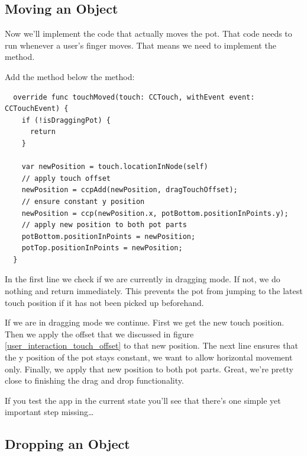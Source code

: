 \subsection{Moving an Object}
Now we'll implement the code that actually moves the pot. That code needs to run
whenever a user's finger moves. That means we need to implement the
 method.
\begin{leftbar}
Add the  method below the  method:
\begin{lstlisting}
  override func touchMoved(touch: CCTouch, withEvent event: CCTouchEvent) {
    if (!isDraggingPot) {
      return
    }
    
    var newPosition = touch.locationInNode(self)
    // apply touch offset
    newPosition = ccpAdd(newPosition, dragTouchOffset);
    // ensure constant y position
    newPosition = ccp(newPosition.x, potBottom.positionInPoints.y);
    // apply new position to both pot parts
    potBottom.positionInPoints = newPosition;
    potTop.positionInPoints = newPosition;
  }
\end{lstlisting}
\end{leftbar}
In the first line we check if we are currently in dragging mode. If not, we do
nothing and return immediately. This prevents the pot from jumping to the latest
touch position if it has not been picked up beforehand.

If we are in dragging mode we continue. First we get the new touch position.
Then we apply the offset that we discussed in figure
\ref{user_interaction_touch_offset} to that new position. The next line ensures
that the y position of the pot stays constant, we want to allow horizontal
movement only. Finally, we apply that new position to both pot parts. Great,
we're pretty close to finishing the drag and drop functionality.

If you test the app in the current state you'll see that there's one simple yet
important step missing\ldots

\subsection{Dropping an Object}

